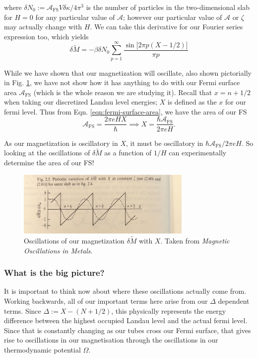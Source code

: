 \documentclass[12pt]{revtex4-2}
\begin{document}
where $\delta N_0 := \mathcal{A}_\text{FS}V\delta\kappa/4\pi^3$ is the number of particles in the two-dimensional slab for $H=0$ for any particular value of $\mathcal{A}$; however our particular value of $\mathcal{A}$ or $\zeta$ may actually change with $H$.  We can take this derivative for our Fourier series expression too, which yields
\begin{equation}
    \boxed{ \delta \tilde{M} = -\beta \delta N_0 \sum_{p=1}^\infty \frac{\sin\big[ 2\pi  p(X - 1/2) \big]}{\pi p} }
\end{equation}

While we have shown that our magnetization will oscillate, also shown pictorially in Fig. \ref{fig:oscillations-mag}, we have not show how it has anything to do with our Fermi surface area $\mathcal{A}_\text{FS}$ (which is the whole reason we are studying it).  Recall that $x = n + 1/2$ when taking our discretized Landau level energies; $X$ is defined as the $x$ for our fermi level.  Thus from Eqn. \ref{eqn:fermi-surface-area}, we have the area of our FS 
\begin{equation}
    \mathcal{A}_\text{FS} = \frac{2\pi eH X}{\hbar} \implies X = \frac{\hbar \mathcal{A}_\text{FS}}{2\pi eH}.
\end{equation}

As our magnetization is oscillatory in $X$, it must be oscillatory in $\hbar\mathcal{A}_\text{FS}/2\pi eH$.  So looking at the oscillations of $\delta \tilde{M}$ as a function of $1/H$ can experimentally determine the area of our FS!

\begin{figure}[tb]
\centering
\includegraphics[width=0.75\textwidth]{figures/oscillations_magnetization.jpg}
\caption{Oscillations of our magnetization $\delta \tilde{M}$ with $X$.  Taken from \textit{Magnetic Oscillations in Metals}.}
\label{fig:oscillations-mag}
\end{figure}

\subsubsection*{What is the big picture?}
It is important to think now about where these oscillations actually come from.  Working backwards, all of our important terms here arise from our $\Delta$ dependent terms.  Since $\Delta := X - (N + 1/2)$, this physically represents the energy difference between the highest occupied Landau level and the actual fermi level.  Since that is constantly changing as our tubes cross our Fermi surface, that gives rise to oscillations in our magnetisation through the oscillations in our thermodynamic potential $\Omega$.  
\end{document}
